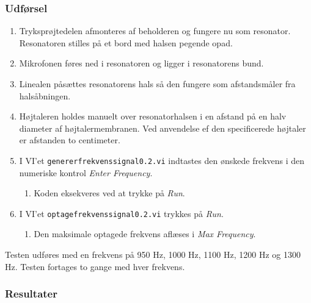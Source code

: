 		\subsubsection{Udførsel}
			
			\begin{enumerate}
				\item Tryksprøjtedelen afmonteres af beholderen og fungere nu som resonator. Resonatoren stilles på et bord med halsen pegende opad. 
				\item Mikrofonen føres ned i resonatoren og ligger i resonatorens bund. 
				\item Linealen påsættes resonatorens hals så den fungere som afstandsmåler fra halsåbningen.
				\item Højtaleren holdes manuelt over resonatorhalsen i en afstand på en halv diameter af højtalermembranen. Ved anvendelse ef den specificerede højtaler er afstanden to centimeter. 
				\item I VI'et \texttt{genererfrekvenssignal0.2.vi} indtastes den ønskede frekvens i den numeriske kontrol \textit{Enter Frequency}. 
					\begin{enumerate}
						\item Koden eksekveres ved at trykke på \textit{Run}. 
					\end{enumerate} 
				\item I VI'et \texttt{optagefrekvenssignal0.2.vi} trykkes på \textit{Run}. 
					\begin{enumerate}
						\item Den maksimale optagede frekvens aflæses i \textit{Max Frequency}. 
					\end{enumerate}	 	
			\end{enumerate}
			
			Testen udføres med en frekvens på 950 Hz, 1000 Hz, 1100 Hz, 1200 Hz og 1300 Hz. Testen fortages to gange med hver frekvens.  
			
			\subsubsection{Resultater}
			
